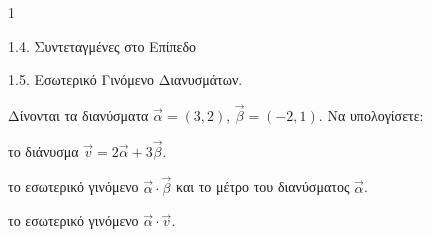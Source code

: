 \begin{ylh}{1}
    \item 1.4. Συντεταγμένες στο Επίπεδο
    \item 1.5. Εσωτερικό Γινόμενο Διανυσμάτων.
\end{ylh}
Δίνονται τα διανύσματα $\vec{\alpha} = (3,2)$, $\vec{\beta} = (-2,1)$.
Να υπολογίσετε:
\begin{alist}
\item το διάνυσμα $\vec{v} = 2\vec{\alpha} + 3\vec{\beta}$. 
\item το εσωτερικό γινόμενο $\vec{\alpha} \cdot \vec{\beta}$ και το μέτρο του διανύσματος $\vec{\alpha}$. 
\item το εσωτερικό γινόμενο $\vec{\alpha} \cdot \vec{v}$. 
\end{alist}